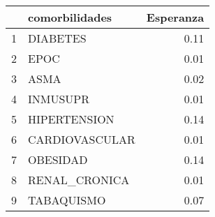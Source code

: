 \begin{table}[ht]
\centering
\begin{tabular}{rlr}
  \hline
 & comorbilidades & Esperanza \\ 
  \hline
1 & DIABETES & 0.11 \\ 
  2 & EPOC & 0.01 \\ 
  3 & ASMA & 0.02 \\ 
  4 & INMUSUPR & 0.01 \\ 
  5 & HIPERTENSION & 0.14 \\ 
  6 & CARDIOVASCULAR & 0.01 \\ 
  7 & OBESIDAD & 0.14 \\ 
  8 & RENAL\_CRONICA & 0.01 \\ 
  9 & TABAQUISMO & 0.07 \\ 
   \hline
\end{tabular}
\end{table}
